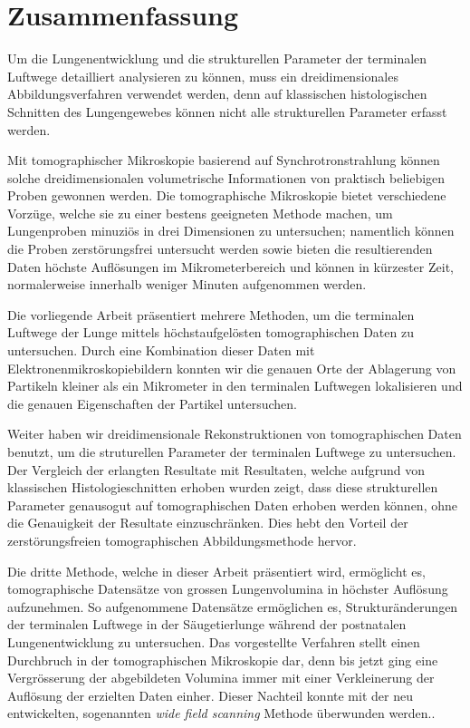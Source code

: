 \acresetall
{}%
\hfill
\vfill
\begingroup%
\let\clearpage\relax%
\let\cleardoublepage\relax%
\let\cleardoublepage\relax%
%
\chapter*{Zusammenfassung}
Um die Lungenentwicklung und die strukturellen Parameter der terminalen Luftwege detailliert analysieren zu können, muss ein dreidimensionales Abbildungsverfahren verwendet werden, denn auf klassischen histologischen Schnitten des Lungengewebes können nicht alle strukturellen Parameter erfasst werden.

Mit tomographischer Mikroskopie basierend auf Synchrotronstrahlung können solche dreidimensionalen volumetrische Informationen von praktisch beliebigen Proben gewonnen werden. Die tomographische Mikroskopie bietet verschiedene Vorzüge, welche sie zu einer bestens geeigneten Methode machen, um Lungenproben minuziös in drei Dimensionen zu untersuchen; namentlich können die Proben zerstörungsfrei untersucht werden sowie bieten die resultierenden Daten höchste Auflösungen im Mikrometerbereich und können in kürzester Zeit, normalerweise innerhalb weniger Minuten aufgenommen werden.

Die vorliegende Arbeit präsentiert mehrere Methoden, um die terminalen Luftwege der Lunge mittels höchstaufgelösten tomographischen Daten zu untersuchen. Durch eine Kombination dieser Daten mit Elektronenmikroskopiebildern konnten wir die genauen Orte der Ablagerung von Partikeln kleiner als ein Mikrometer in den terminalen Luftwegen lokalisieren und die genauen Eigenschaften der Partikel untersuchen.

Weiter haben wir dreidimensionale Rekonstruktionen von tomographischen Daten benutzt, um die struturellen Parameter der terminalen Luftwege zu untersuchen. Der Vergleich der erlangten Resultate mit Resultaten, welche aufgrund von klassischen Histologieschnitten erhoben wurden zeigt, dass diese strukturellen Parameter genausogut auf tomographischen Daten erhoben werden können, ohne die Genauigkeit der Resultate einzuschränken. Dies hebt den Vorteil der zerstörungsfreien tomographischen Abbildungsmethode hervor.

Die dritte Methode, welche in dieser Arbeit präsentiert wird, ermöglicht es, tomographische Datensätze von grossen Lungenvolumina in höchster Auflösung aufzunehmen. So aufgenommene Datensätze ermöglichen es, Strukturänderungen der terminalen Luftwege in der Säugetierlunge während der postnatalen Lungenentwicklung zu untersuchen. Das vorgestellte Verfahren stellt einen Durchbruch in der tomographischen Mikroskopie dar, denn bis jetzt ging eine Vergrösserung der abgebildeten Volumina immer mit einer Verkleinerung der Auflösung der erzielten Daten einher. Dieser Nachteil konnte mit der neu entwickelten, sogenannten \emph{wide field scanning} Methode überwunden werden..
%
\endgroup%